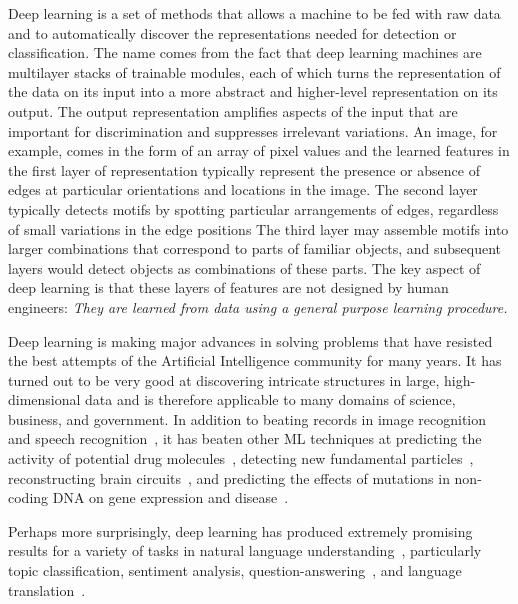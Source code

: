 \documentclass[10pts]{article}
\begin{document}
Deep learning is a set of methods that allows a machine to be fed with
raw data and to automatically discover the representations needed for
detection or classification. The name comes from the fact that deep learning machines are
multilayer stacks of trainable modules, each of which turns the
representation of the data on its input into a more abstract and
higher-level representation on its output. The output representation
amplifies aspects of the input that are important for discrimination
and suppresses irrelevant variations. An image, for example, comes in the form of an array of
pixel values and the learned features in the first layer of representation
typically represent the presence
or absence of edges at  particular orientations and locations in
the image. The second layer typically detects motifs by spotting particular
arrangements of edges, regardless of small variations in the edge positions
The third layer  may assemble motifs into larger
combinations that correspond to parts of familiar
objects, and subsequent layers would detect objects as combinations of
these parts. The key aspect of deep learning is that these layers of
features are not designed by human engineers: {\em They are learned from
data using a general purpose learning procedure.}

Deep learning is making major advances in solving problems that have
resisted the best attempts of the Artificial Intelligence community
for many years. It has turned out to be very good at discovering
intricate structures in large, high-dimensional data and is therefore
applicable to many domains of science, business, and government. In
addition to beating records in image
recognition~\citep{Krizhevsky-2012-small,farabet-pami-13,tompson-nips-14,szegedy-2014}
and speech
recognition~\citep{Hinton-et-al-2012,Sainath-et-al-ICASSP2013}, it has
beaten other ML techniques at predicting the activity of potential
drug molecules~\citep{Ma-et-al-2015}, detecting new fundamental
particles~\citep{Ciodaro-et-al-2012,Melis-Higgs-boson-competition-2014},
reconstructing brain circuits~\citep{helmstaedter-nature-2013}, and
predicting the effects of mutations in non-coding DNA on gene
expression and disease~\citep{Keung-et-al-2014,Xiong-et-al-Frey-science2015}.

Perhaps more surprisingly, deep learning has produced extremely
promising results for a variety of tasks in natural language
understanding~\citep{collobert:2011b}, particularly topic
classification, %
sentiment
analysis, %
question-answering~\cite{Bordes-et-al-EMNLP2014}, and language
translation~\cite{Jean-et-al-arxiv2014,Sutskever-et-al-NIPS2014}.
\end{document}
